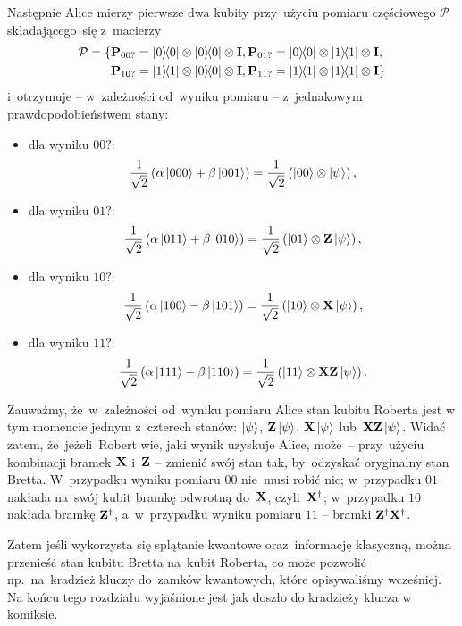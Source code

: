 Następnie Alice mierzy pierwsze dwa kubity przy~użyciu pomiaru częściowego $\mathcal{P}$ składającego~się z~macierzy
\begin{equation*}
	\begin{split}
		\mathcal{P} = \{&\mathbf{P}_{00?}=\ketbra{0}{0}\otimes\ketbra{0}{0}\otimes\mathbf{I}, \mathbf{P}_{01?}=\ketbra{0}{0}\otimes\ketbra{1}{1}\otimes\mathbf{I}, \\
		&\mathbf{P}_{10?}=\ketbra{1}{1}\otimes\ketbra{0}{0}\otimes\mathbf{I}, \mathbf{P}_{11?}=\ketbra{1}{1}\otimes\ketbra{1}{1}\otimes\mathbf{I}\}
	\end{split}
\end{equation*}
i~otrzymuje -- w~zależności od~wyniku pomiaru -- z~jednakowym prawdopodobieństwem stany:
\begin{itemize}
	\item dla wyniku $00?$: $$\frac{1}{\sqrt{2}}\left(\alpha \ket{000}  + \beta \ket{001}\right) = \frac{1}{\sqrt{2}}\left(\ket{00}\otimes \ket{\psi}\right),$$
	\item dla wyniku $01?$: $$\frac{1}{\sqrt{2}}\left(\alpha \ket{011}  + \beta \ket{010}\right) = \frac{1}{\sqrt{2}}\left(\ket{01}\otimes \mathbf{Z}\ket{\psi}\right),$$
	\item dla wyniku $10?$: $$\frac{1}{\sqrt{2}}\left(\alpha \ket{100}  - \beta \ket{101}\right) = \frac{1}{\sqrt{2}}\left(\ket{10}\otimes \mathbf{X}\ket{\psi}\right),$$
	\item dla wyniku $11?$: $$\frac{1}{\sqrt{2}}\left(\alpha \ket{111}  - \beta \ket{110}\right) = \frac{1}{\sqrt{2}}\left(\ket{11}\otimes \mathbf{X}\mathbf{Z}\ket{\psi}\right).$$
\end{itemize}

Zauważmy, że~w~zależności od~wyniku pomiaru Alice stan kubitu Roberta jest
w tym momencie jednym z~czterech stanów: $\ket{\psi}$,
$\mathbf{Z}\ket{\psi}$, $\mathbf{X}\ket{\psi}$ lub~$\mathbf{X}\mathbf{Z}\ket{\psi}$.
Widać zatem, że~jeżeli~Robert wie, jaki wynik uzyskuje Alice, może~--
przy~użyciu kombinacji bramek $\mathbf{X}$ i~$\mathbf{Z}$ -- zmienić swój stan
tak, by~odzyskać oryginalny stan Bretta. W~przypadku wyniku pomiaru $00$
nie~musi robić nic; w~przypadku $01$ nakłada na~swój kubit bramkę
odwrotną do~$\mathbf{X}$, czyli~$\mathbf{X}^\dagger$; w~przypadku $10$ nakłada
bramkę $\mathbf{Z}^\dagger$, a~w~przypadku wyniku pomiaru $11$ -- bramki
$\mathbf{Z}^\dagger \mathbf{X}^\dagger$.

Zatem jeśli wykorzysta się splątanie kwantowe oraz~informację klasyczną, można
przenieść stan kubitu Bretta na~kubit Roberta, co może pozwolić
np.~na~kradzież kluczy do~zamków kwantowych, które opisywaliśmy
wcześniej. Na końcu tego rozdziału wyjaśnione jest jak doszło do kradzieży
klucza w komiksie.
